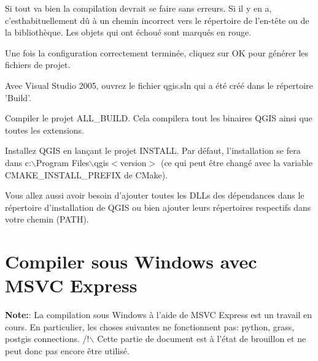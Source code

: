 Si tout va bien la compilation devrait se faire sans erreurs. Si il y en a, c'esthabituellement dû à un chemin incorrect vers le répertoire de l'en-tête ou de la bibliothèque. Les objets qui ont échoué sont marqués en rouge.

% 
% 
% 
% 

Une fois la configuration correctement terminée, cliquez sur OK pour générer les fichiers de projet.

Avec Visual Studio 2005, ouvrez le fichier qgis.sln qui a été créé dans le répertoire 'Build'.

Compiler le projet ALL\_BUILD. Cela compilera tout les binaires QGIS ainsi que toutes les extensions.

Installez QGIS en lançant le projet INSTALL. Par défaut, l'installation se fera dans c:$\backslash$Program Files$\backslash$qgis$<$version$>$ (ce qui peut être changé avec la variable CMAKE\_INSTALL\_PREFIX de CMake). 

Vous allez aussi avoir besoin d'ajouter toutes les DLLs des dépendances dans le répertoire d'installation de QGIS ou bien ajouter leurs répertoires respectifs dans votre chemin (PATH).


\section{Compiler sous Windows avec MSVC Express}
\textbf{Note:}: La compilation sous Windows à l'aide de MSVC Express est un travail en cours. En particulier, les choses suivantes ne fonctionnent pas:
python, grass, postgis connections.
/!$\backslash$ Cette partie de document est à l'état de brouillon et ne peut donc pas encore être utilisé.


